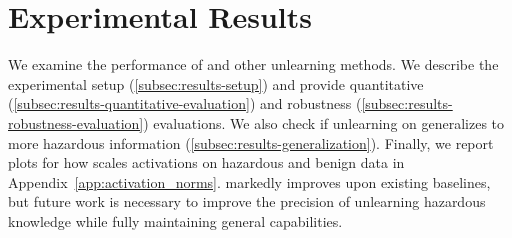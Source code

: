 

\section{Experimental Results}\label{sec:experiments}
We examine the performance of \method{} and other unlearning methods. We describe the experimental setup (\cref{subsec:results-setup}) and provide quantitative (\cref{subsec:results-quantitative-evaluation}) and robustness (\cref{subsec:results-robustness-evaluation}) evaluations. We also check if unlearning on \benchmark{} generalizes to more hazardous information (\cref{subsec:results-generalization}). Finally, we report plots for how \method{} scales activations on hazardous and benign data in Appendix~\ref{app:activation_norms}. \method{} markedly improves upon existing baselines, but future work is necessary to improve the precision of unlearning hazardous knowledge while fully maintaining general capabilities.
